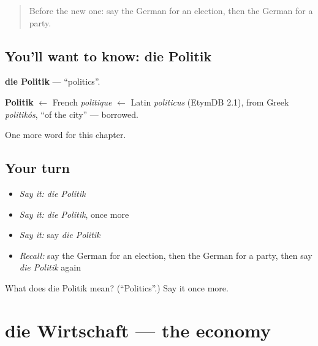 \label{lesson:GE-C209-politik}



\begin{quote}
Before the new one: say the German for an election, then the German for a party.
\end{quote}

\subsection*{You'll want to know: die Politik}
\textbf{die Politik} — \textquotedblleft{}politics\textquotedblright{}.

\begin{cousinweb}
\textbf{Politik} $\leftarrow$ French \emph{politique} $\leftarrow$ Latin \emph{politicus} (EtymDB 2.1), from Greek \emph{politikós}, \textquotedblleft{}of the city\textquotedblright{} — borrowed.
\end{cousinweb}

\begin{grammarlens}[title={What you've built}]
One more word for this chapter.
\end{grammarlens}

\subsection*{Your turn}
\begin{itemize}
\raggedright
  \item \emph{Say it:} \emph{die Politik}
  \item \emph{Say it:} \emph{die Politik}, once more
  \item \emph{Say it:} say \emph{die Politik}
  \item \emph{Recall:} say the German for an election, then the German for a party, then say \emph{die Politik} again
\end{itemize}

\begin{tcolorbox}[breakable,colback=teal!4,colframe=teal!35!black,title={Before you move on}]
What does die Politik mean? (\textquotedblleft{}Politics\textquotedblright{}.) Say it once more.
\end{tcolorbox}
\section[die Wirtschaft]{die Wirtschaft — the economy}

\label{lesson:GE-C209-wirtschaft}



